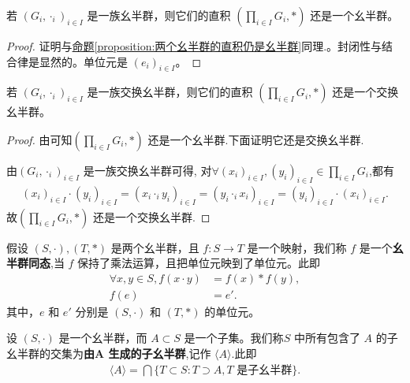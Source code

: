 \documentclass[../../main.tex]{subfiles}
\begin{document}
\begin{proposition}[一族幺半群的直积仍是幺半群]\label{proposition:一族幺半群的直积仍是幺半群}
若 $(G_i,\cdot_i)_{i\in I}$ 是一族幺半群，则它们的直积 $(\prod_{i\in I}G_i,*)$ 还是一个幺半群。  
\end{proposition}
\begin{proof}
证明与\hyperref[proposition:两个幺半群的直积仍是幺半群]{命题\ref{proposition:两个幺半群的直积仍是幺半群}}同理.。封闭性与结合律是显然的。单位元是 $(e_i)_{i\in I}$。 
\end{proof}

\begin{proposition}[一族交换幺半群的直积仍是交换幺半群]\label{proposition:一族交换幺半群的直积仍是交换幺半群}
若 $(G_i,\cdot_i)_{i\in I}$ 是一族交换幺半群，则它们的直积 $(\prod_{i\in I}G_i,*)$ 还是一个交换幺半群。  
\end{proposition}
\begin{proof}
由可知$(\prod_{i\in I}G_i,*)$ 还是一个幺半群.下面证明它还是交换幺半群.

由$(G_i,\cdot_i)_{i\in I}$ 是一族交换幺半群可得,
对$\forall (x_i)_{i\in I},(y_i)_{i\in I} \in \prod_{i\in I}G_i$,都有
\begin{align*}
\left( x_i \right) _{i\in I}\cdot \left( y_i \right) _{i\in I}=\left( x_i\cdot _iy_i \right) _{i\in I}=\left( y_i\cdot _ix_i \right) _{i\in I}=\left( y_i \right) _{i\in I}\cdot \left( x_i \right) _{i\in I}.
\end{align*}
故$(\prod_{i\in I}G_i,*)$ 还是一个交换幺半群.
\end{proof}

\begin{definition}[幺半群同态]
假设 $(S, \cdot), (T, *)$ 是两个幺半群，且 $f : S \to T$ 是一个映射，我们称 $f$ 是一个\textbf{幺半群同态},当 $f$ 保持了乘法运算，且把单位元映到了单位元。此即
\begin{align*}
\forall x, y \in S, f(x \cdot y) &= f(x) * f(y) ,\\
f(e) &= e'.
\end{align*}
其中，$e$ 和 $e'$ 分别是 $(S, \cdot)$ 和 $(T, *)$ 的单位元。 
\end{definition}

\begin{definition}[由子集生成的子幺半群]
设 $(S, \cdot)$ 是一个幺半群，而 $A \subset S$ 是一个子集。我们称$S$ 中所有包含了 $A$ 的子幺半群的交集为\textbf{由$\boldsymbol{A}$ 生成的子幺半群},记作 $\langle A \rangle$.此即
\begin{align*}
\langle A \rangle = \bigcap \{T \subset S : T \supset A, T \text{ 是子幺半群}\}.
\end{align*} 
\end{definition}
\end{document}
